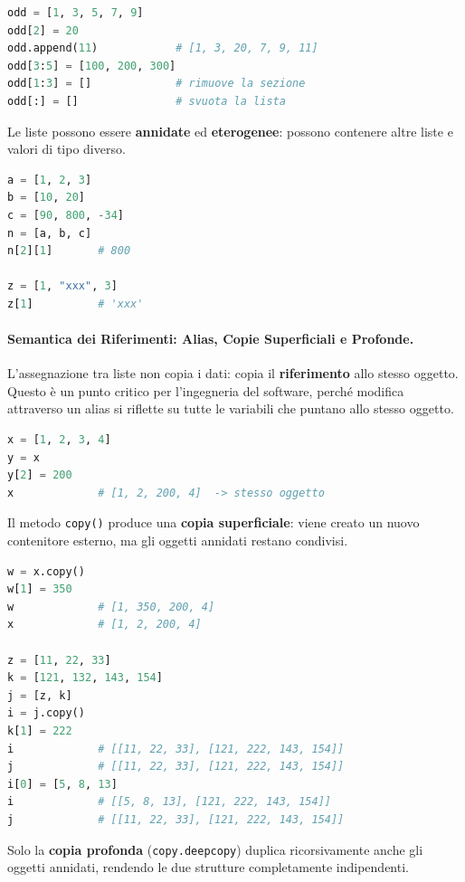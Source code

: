 \documentclass[12pt]{extarticle}
\begin{document}
\begin{lstlisting}[language=Python]
odd = [1, 3, 5, 7, 9]
odd[2] = 20
odd.append(11)            # [1, 3, 20, 7, 9, 11]
odd[3:5] = [100, 200, 300]
odd[1:3] = []             # rimuove la sezione
odd[:] = []               # svuota la lista
\end{lstlisting}

\noindent Le liste possono essere \textbf{annidate} ed \textbf{eterogenee}: possono contenere altre liste e valori di tipo diverso.

\begin{lstlisting}[language=Python]
a = [1, 2, 3]
b = [10, 20]
c = [90, 800, -34]
n = [a, b, c]
n[2][1]       # 800

z = [1, "xxx", 3]
z[1]          # 'xxx'
\end{lstlisting}

\paragraph{Semantica dei Riferimenti: Alias, Copie Superficiali e Profonde.}
L'assegnazione tra liste non copia i dati: copia il \textbf{riferimento} allo stesso oggetto. Questo è un punto critico per l'ingegneria del software, perché modifica attraverso un alias si riflette su tutte le variabili che puntano allo stesso oggetto.

\begin{lstlisting}[language=Python]
x = [1, 2, 3, 4]
y = x
y[2] = 200
x             # [1, 2, 200, 4]  -> stesso oggetto
\end{lstlisting}

\noindent Il metodo \texttt{copy()} produce una \textbf{copia superficiale}: viene creato un nuovo contenitore esterno, ma gli oggetti annidati restano condivisi.

\begin{lstlisting}[language=Python]
w = x.copy()
w[1] = 350
w             # [1, 350, 200, 4]
x             # [1, 2, 200, 4]

z = [11, 22, 33]
k = [121, 132, 143, 154]
j = [z, k]
i = j.copy()
k[1] = 222
i             # [[11, 22, 33], [121, 222, 143, 154]]
j             # [[11, 22, 33], [121, 222, 143, 154]]
i[0] = [5, 8, 13]
i             # [[5, 8, 13], [121, 222, 143, 154]]
j             # [[11, 22, 33], [121, 222, 143, 154]]
\end{lstlisting}

\noindent Solo la \textbf{copia profonda} (\texttt{copy.deepcopy}) duplica ricorsivamente anche gli oggetti annidati, rendendo le due strutture completamente indipendenti.
\end{document}
